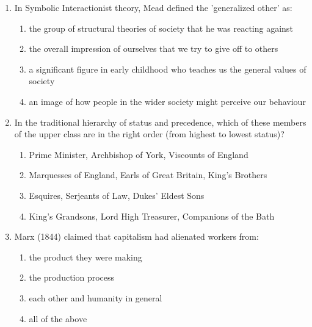 \documentclass[12pt]{article}
\begin{document}
\begin{enumerate}[label=\arabic*.]
\begin{enumerate}[label=(\alph*)]
    \item a means of transporting money between different areas of a country
    \item an empire with a bureaucratic administration but no political centre
    \item an awareness of risks and dangers that affect the environment as a whole
    \item a unit with a division of labour that extends across ethnic and cultural groups
\end{enumerate}
\item In Symbolic Interactionist theory, Mead defined the 'generalized other' as:
\begin{enumerate}[label=(\alph*)]
    \item the group of structural theories of society that he was reacting against
    \item the overall impression of ourselves that we try to give off to others
    \item a significant figure in early childhood who teaches us the general values of society
    \item an image of how people in the wider society might perceive our behaviour
\end{enumerate}
\item In the traditional hierarchy of status and precedence, which of these members of the upper class are in the right order (from highest to lowest status)?
\begin{enumerate}[label=(\alph*)]
    \item Prime Minister, Archbishop of York, Viscounts of England
    \item Marquesses of England, Earls of Great Britain, King's Brothers
    \item Esquires, Serjeants of Law, Dukes' Eldest Sons
    \item King's Grandsons, Lord High Treasurer, Companions of the Bath
\end{enumerate}
\item Marx (1844) claimed that capitalism had alienated workers from:
\begin{enumerate}[label=(\alph*)]
    \item the product they were making
    \item the production process
    \item each other and humanity in general
    \item all of the above
\end{enumerate}

\end{enumerate}
\end{document}
